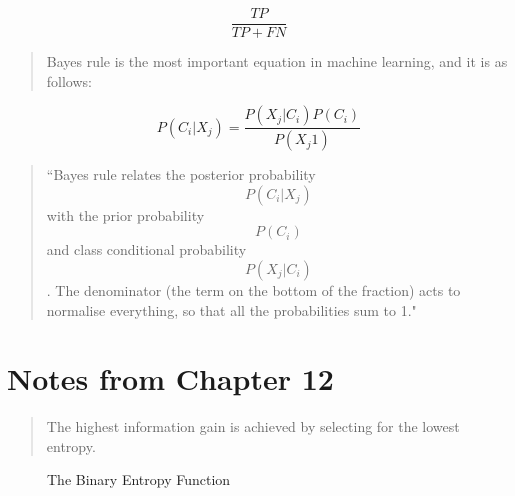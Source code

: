 \documentclass[12pt]{article}
\begin{document}
\begin{equation}
\frac{TP}{TP + FN}
\end{equation}

\begin{verse}
Bayes rule is the most important equation in machine learning, and it is as follows:
\end{verse}

\begin{equation}
P(C_i|X_j) = \frac{P(X_j|C_i)P(C_i)}{P(X_j1)}
\end{equation}

\begin{verse}
``Bayes rule relates the posterior probability $$P(C_i|X_j)$$ with the prior 
probability $$P(C_i)$$ and class conditional probability $$P(X_j|C_i)$$. The denominator (the term on the bottom of the fraction) acts to normalise everything, so that all the probabilities sum to 1."
\end{verse}

\section{Notes from Chapter 12}
\begin{verse}
The highest information gain is achieved by selecting for the lowest entropy.
\end{verse}

\begin{figure}
\centering
{}
\caption{The Binary Entropy Function} \label{fig:M1}
\end{figure}
\end{document}
